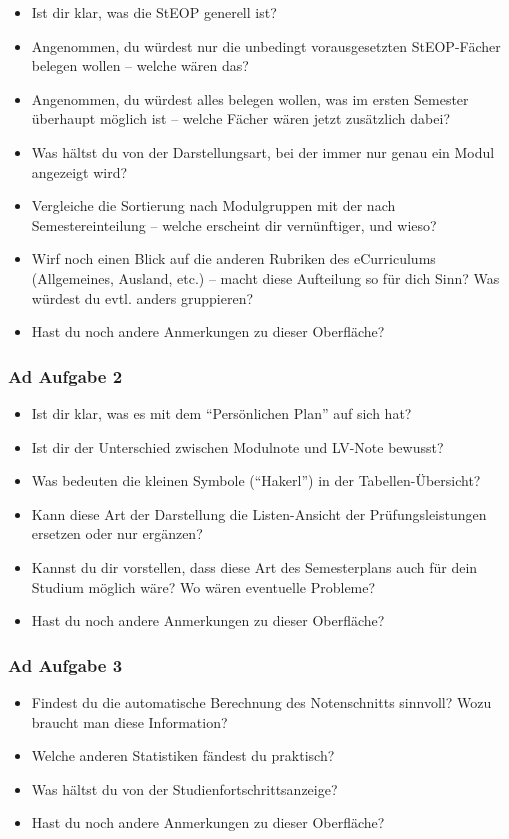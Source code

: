 \documentclass[a4paper,10pt]{scrartcl}
\begin{document}
\begin{itemize}
 \item Ist dir klar, was die StEOP generell ist?
 \item Angenommen, du würdest nur die unbedingt vorausgesetzten StEOP-Fächer belegen wollen -- welche wären das?
 \item Angenommen, du würdest alles belegen wollen, was im ersten Semester überhaupt möglich ist -- welche Fächer wären jetzt zusätzlich dabei?
 \item Was hältst du von der Darstellungsart, bei der immer nur genau ein Modul angezeigt wird?
 \item Vergleiche die Sortierung nach Modulgruppen mit der nach Semestereinteilung -- welche erscheint dir vernünftiger, und wieso?
 \item Wirf noch einen Blick auf die anderen Rubriken des eCurriculums (Allgemeines, Ausland, etc.) -- macht diese Aufteilung so für dich Sinn? Was würdest du evtl. anders gruppieren?
 \item Hast du noch andere Anmerkungen zu dieser Oberfläche?
\end{itemize}

\subsubsection*{Ad Aufgabe 2}

\begin{itemize}
 \item Ist dir klar, was es mit dem ``Persönlichen Plan'' auf sich hat?
 \item Ist dir der Unterschied zwischen Modulnote und LV-Note bewusst?
 \item Was bedeuten die kleinen Symbole (``Hakerl'') in der Tabellen-Übersicht?
 \item Kann diese Art der Darstellung die Listen-Ansicht der Prüfungsleistungen ersetzen oder nur ergänzen?
 \item Kannst du dir vorstellen, dass diese Art des Semesterplans auch für dein Studium möglich wäre? Wo wären eventuelle Probleme?
 \item Hast du noch andere Anmerkungen zu dieser Oberfläche?
\end{itemize}

\subsubsection*{Ad Aufgabe 3}

\begin{itemize}
 \item Findest du die automatische Berechnung des Notenschnitts sinnvoll? Wozu braucht man diese Information?
 \item Welche anderen Statistiken fändest du praktisch?
 \item Was hältst du von der Studienfortschrittsanzeige?
 \item Hast du noch andere Anmerkungen zu dieser Oberfläche?
\end{itemize}
\end{document}
